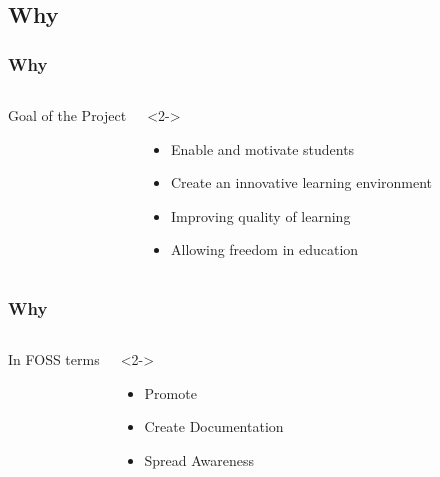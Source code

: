 \documentclass[compress,red]{beamer} %
\begin{document}
\subsection{Why}
\begin{frame}
\frametitle{Why}
\begin{columns}
\begin{exampleblock}{}
Goal of the Project
\end{exampleblock}
\begin{exampleblock}<2->{}
\begin{itemize}
\item Enable and motivate students
\item Create an innovative learning environment
\item Improving quality of learning
\item Allowing freedom in education
\end{itemize}
\end{exampleblock}
\end{columns}
\end{frame}

\begin{frame}
\frametitle{Why}
\begin{columns}
\begin{exampleblock}{}
In FOSS terms
\end{exampleblock}
\begin{exampleblock}<2->{}
\begin{itemize}
\item Promote 
\item Create Documentation
\item Spread Awareness
\end{itemize}
\end{exampleblock}
\end{columns}
\end{frame}
\end{document}
